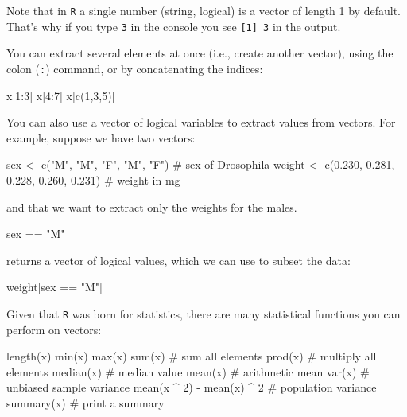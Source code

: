 \documentclass[
  letterpaper,
  DIV=11,
  numbers=noendperiod]{scrreprt}
\newenvironment{Shaded}{\begin{snugshade}}{\end{snugshade}}
\newcommand{\NormalTok}[1]{\textcolor[rgb]{0.00,0.23,0.31}{#1}}
\begin{document}
Note that in \texttt{R} a single number (string, logical) is a vector of
length 1 by default. That's why if you type \texttt{3} in the console
you see \texttt{{[}1{]}\ 3} in the output.

You can extract several elements at once (i.e., create another vector),
using the colon (\texttt{:}) command, or by concatenating the indices:

\begin{Shaded}
\begin{Highlighting}[]
\NormalTok{x[1:3]}
\NormalTok{x[4:7]}
\NormalTok{x[c(1,3,5)]}
\end{Highlighting}
\end{Shaded}

You can also use a vector of logical variables to extract values from
vectors. For example, suppose we have two vectors:

\begin{Shaded}
\begin{Highlighting}[]
\NormalTok{sex \textless{}{-} c("M", "M", "F", "M", "F") \# sex of Drosophila}
\NormalTok{weight \textless{}{-} c(0.230, 0.281, 0.228, 0.260, 0.231) \# weight in mg}
\end{Highlighting}
\end{Shaded}

and that we want to extract only the weights for the males.

\begin{Shaded}
\begin{Highlighting}[]
\NormalTok{sex == "M"}
\end{Highlighting}
\end{Shaded}

returns a vector of logical values, which we can use to subset the data:

\begin{Shaded}
\begin{Highlighting}[]
\NormalTok{weight[sex == "M"]}
\end{Highlighting}
\end{Shaded}

Given that \texttt{R} was born for statistics, there are many
statistical functions you can perform on vectors:

\begin{Shaded}
\begin{Highlighting}[]
\NormalTok{length(x)}
\NormalTok{min(x)}
\NormalTok{max(x)}
\NormalTok{sum(x) \# sum all elements}
\NormalTok{prod(x) \# multiply all elements}
\NormalTok{median(x) \# median value}
\NormalTok{mean(x) \# arithmetic mean}
\NormalTok{var(x) \# unbiased sample variance}
\NormalTok{mean(x \^{} 2) {-} mean(x) \^{} 2 \# population variance}
\NormalTok{summary(x) \# print a summary}
\end{Highlighting}
\end{Shaded}
\end{document}
